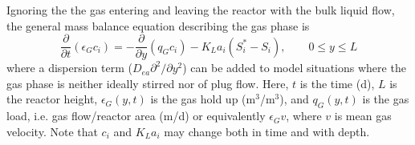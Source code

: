 Ignoring the the gas entering and leaving the reactor with the bulk liquid flow, the general mass balance equation describing the gas phase is
\begin{equation}\label{eq:gasflow}
\frac{\partial}{\partial t}(\epsilon_G c_i)=-\frac{\partial}{\partial y}(q_Gc_i)-K_La_i(S_i^\ast-S_i),\qquad 0\le y\le L
\end{equation}
where a dispersion term ($D_{ea}\partial^2/\partial y^2$) can be added to model situations where the gas phase is neither ideally stirred nor of plug flow. Here, $t$ is the time (d), $L$ is the reactor height, $\epsilon_G(y,t)$ is the gas hold up (m$^3$/m$^3$), and $q_G(y,t)$ is the gas load, i.e. gas flow/reactor area (m/d) or equivalently $\epsilon_Gv$, where $v$ is mean gas velocity. Note that $c_i$ and $K_La_i$ may change both in time and with depth.

